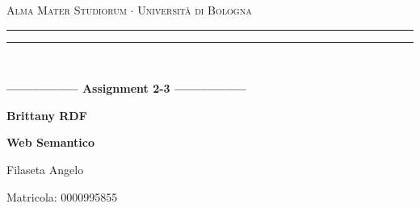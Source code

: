 \begin{titlepage}
    \begin{center}
        {{\Large{\textsc{Alma Mater Studiorum $\cdot$ Università di Bologna}}}}
        \rule[0.1cm]{15.8cm}{0.1mm}
        \rule[0.5cm]{15.8cm}{0.6mm}
        \\
        \vspace{3mm}
    \end{center}
    \vspace{2mm}
    \begin{center}
        {\LARGE{\bf{----------------- Assignment 2-3 -----------------}}}
        \vspace{5mm} \par \noindent
        {\Huge{\bf{Brittany RDF}}}
        \vspace{10mm} \par \noindent
        {\LARGE \textbf{Web Semantico}}
        \vspace{15mm} \par \noindent
        {\Large Filaseta Angelo}
        \vspace{15mm} \par \noindent
        {\Large Matricola: 0000995855}
    \end{center}
    \hfill
    \vspace{40mm}
\end{titlepage}
